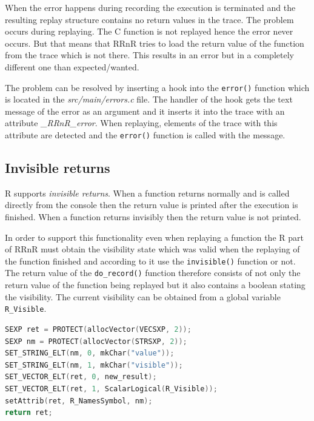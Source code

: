 \documentclass[thesis=M,english,hidelinks]{FITthesis}[2012/10/20]
\begin{document}
		When the error happens during recording the execution is terminated and the resulting replay structure contains no return values in the trace. The problem occurs during replaying. The C function is not replayed hence the error never occurs. But that means that RRnR tries to load the return value of the function from the trace which is not there. This results in an error but in a completely different one than expected/wanted.\par
		
		The problem can be resolved by inserting a hook into the \lstinline|error()| function which is located in the \emph{src/main/errors.c} file. The handler of the hook gets the text message of the error as an argument and it inserts it into the trace with an attribute \emph{\_RRnR\_error}. When replaying, elements of the trace with this attribute are detected and the \lstinline|error()| function is called with the message.\par
		
		\subsection{Invisible returns}
		R supports \emph{invisible returns}. When a function returns normally and is called directly from the console then the return value is printed after the execution is finished. When a function returns invisibly then the return value is not printed.\par
		
		In order to support this functionality even when replaying a function the R part of RRnR must obtain the visibility state which was valid when the replaying of the function finished and according to it use the \lstinline|invisible()| function or not. The return value of the \lstinline|do_record()| function therefore consists of not only the return value of the function being replayed but it also contains a boolean stating the visibility. The current visibility can be obtained from a global variable \lstinline|R_Visible|.\par
		
\begin{lstlisting}[style=filestyle, language=C, caption={Creating the two part return structure with the return value and its visibility}]
SEXP ret = PROTECT(allocVector(VECSXP, 2));
SEXP nm = PROTECT(allocVector(STRSXP, 2));
SET_STRING_ELT(nm, 0, mkChar("value"));
SET_STRING_ELT(nm, 1, mkChar("visible"));
SET_VECTOR_ELT(ret, 0, new_result);
SET_VECTOR_ELT(ret, 1, ScalarLogical(R_Visible));
setAttrib(ret, R_NamesSymbol, nm);
return ret;
\end{lstlisting}
\end{document}
